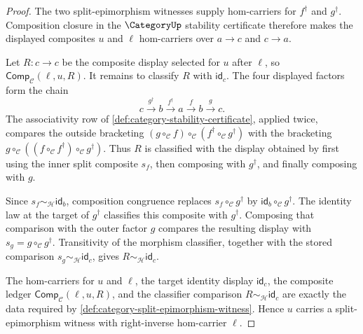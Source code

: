 \begin{proof}
The two split-epimorphism witnesses supply hom-carriers for $f^\dagger$ and
$g^\dagger$. Composition closure in the $\CategoryUp$ stability certificate
therefore makes the displayed composites $u$ and $\ell$ hom-carriers over
$a\to c$ and $c\to a$.

Let $R:c\to c$ be the composite display selected for $u$ after $\ell$, so
$\mathsf{Comp}_{\mathcal C}(\ell,u,R)$. It remains to classify $R$ with
$\mathsf{id}_c$. The four displayed factors form the chain
$$
c\xrightarrow{g^\dagger}b\xrightarrow{f^\dagger}a
\xrightarrow{f}b\xrightarrow{g}c.
$$
The associativity row of \autoref{def:category-stability-certificate}, applied
twice, compares the outside bracketing
$(g\circ_{\mathcal C} f)\circ_{\mathcal C}(f^\dagger\circ_{\mathcal C}g^\dagger)$
with the bracketing
$g\circ_{\mathcal C}((f\circ_{\mathcal C}f^\dagger)\circ_{\mathcal C}g^\dagger)$.
Thus $R$ is classified with the display obtained by first using the inner
split composite $s_f$, then composing with $g^\dagger$, and finally composing
with $g$.

Since $s_f\sim_{\mathcal H}\mathsf{id}_b$, composition congruence replaces
$s_f\circ_{\mathcal C}g^\dagger$ by
$\mathsf{id}_b\circ_{\mathcal C}g^\dagger$. The identity law at the target of
$g^\dagger$ classifies this composite with $g^\dagger$. Composing that
comparison with the outer factor $g$ compares the resulting display with
$s_g=g\circ_{\mathcal C}g^\dagger$. Transitivity of the morphism classifier,
together with the stored comparison $s_g\sim_{\mathcal H}\mathsf{id}_c$, gives
$R\sim_{\mathcal H}\mathsf{id}_c$.

The hom-carriers for $u$ and $\ell$, the target identity display
$\mathsf{id}_c$, the composite ledger
$\mathsf{Comp}_{\mathcal C}(\ell,u,R)$, and the classifier comparison
$R\sim_{\mathcal H}\mathsf{id}_c$ are exactly the data required by
\autoref{def:category-split-epimorphism-witness}. Hence $u$ carries a
split-epimorphism witness with right-inverse hom-carrier $\ell$.
\end{proof}


